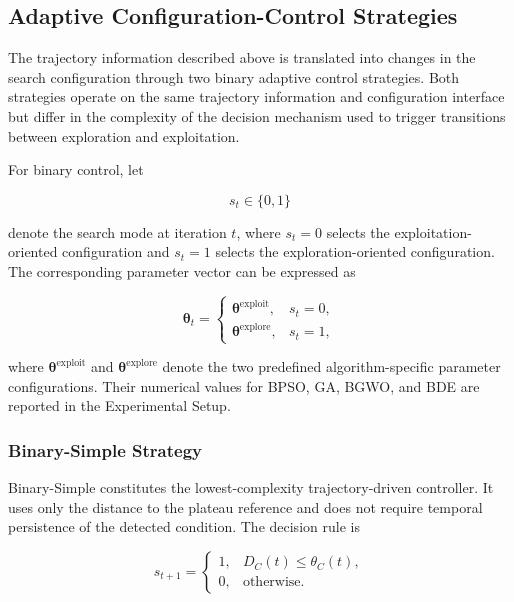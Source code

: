\documentclass[journal,article,submit,moreauthors]{Definitions/mdpi}
\begin{document}
\subsection{Adaptive Configuration-Control Strategies}
\label{sec:adaptation_strategies}

The trajectory information described above is translated into changes in
the search configuration through two binary adaptive control strategies.
Both strategies operate on the same trajectory information and configuration
interface but differ in the complexity of the decision mechanism used to
trigger transitions between exploration and exploitation.

For binary control, let

\begin{equation}
s_t \in \{0,1\}
\end{equation}

denote the search mode at iteration $t$, where $s_t=0$ selects the
exploitation-oriented configuration and $s_t=1$ selects the
exploration-oriented configuration. The corresponding parameter vector can
be expressed as

\begin{equation}
\boldsymbol{\theta}_t =
\begin{cases}
\boldsymbol{\theta}^{\mathrm{exploit}}, & s_t=0,\\
\boldsymbol{\theta}^{\mathrm{explore}}, & s_t=1,
\end{cases}
\label{eq:binary_config}
\end{equation}

where $\boldsymbol{\theta}^{\mathrm{exploit}}$ and
$\boldsymbol{\theta}^{\mathrm{explore}}$ denote the two predefined
algorithm-specific parameter configurations. Their numerical values for
BPSO, GA, BGWO, and BDE are reported in the Experimental Setup.


\subsubsection{Binary-Simple Strategy}

Binary-Simple constitutes the lowest-complexity trajectory-driven controller.
It uses only the distance to the plateau reference and does not require
temporal persistence of the detected condition. The decision rule is

\begin{equation}
s_{t+1} =
\begin{cases}
1, & D_C(t) \leq \theta_C(t),\\
0, & \text{otherwise}.
\end{cases}
\label{eq:binary_simple}
\end{equation}
\end{document}
